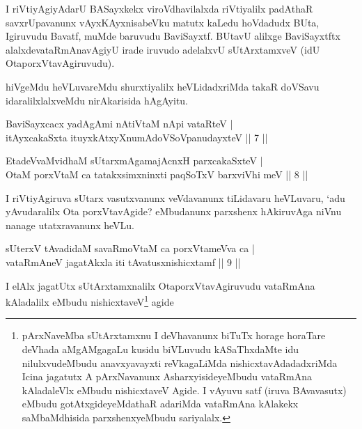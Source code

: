 \begin{artha}
I riVtiyAgiyAdarU BASayxkekx viroVdhavilalxda riVtiyalilx padAthaR savxrUpavanunx vAyxKAyxnisabeVku matutx kaLedu hoVdadudx BUta, Igiruvudu Bavatf, muMde baruvudu BaviSayxtf. BUtavU alilxge BaviSayxtftx alalxde\break vataRmAnavAgiyU irade iruvudo adelalxvU sUtArxtamxveV (idU OtaporxVtavAgiruvudu).

hiVgeMdu heVLuvareMdu shurxtiyalilx heVLidadxriMda takaR doVSavu idaralilxlalxveMdu nirAkarisida hAgAyitu.
\end{artha}%

\begin{shl}
BaviSayxcacx yadAgAmi nAtiVtaM nApi vataRteV |\\
itAyxcakaSxta ituyxkAtxyX\s numAdoVSoV\s panudayxteV \hfill || 7 ||
\end{shl}

\begin{shl}
EtadeVvaMvidhaM sUtarxmAgamajAcnxH parxcakaSxteV |\\
OtaM porxVtaM ca tatakxsimxninxti paqSoTxV barxviVhi meV \hfill || 8 ||
\end{shl}

\begin{artha}
I riVtiyAgiruva sUtarx vasutxvanunx veVdavanunx tiLidavaru heVLuvaru, `adu yAvudaralilx Ota porxVtavAgide? eMbudanunx parxshenx hAkiruvAga niVnu nanage utatxravanunx heVLu.
\end{artha}


\begin{shl}
sUterxV tAvadidaM savaRmoVtaM ca porxVtameVva ca |\\
vataRmAneV jagatAkxla iti tAvatusxnishicxtamf \hfill || 9 ||
\end{shl}

\begin{artha}
I elAlx jagatUtx sUtArxtamxnalilx OtaporxVtavAgiruvudu vataRmAna kAladalilx eMbudu nishicxtaveV\footnote{pArxNaveMba sUtArxtamxnu I deVhavanunx biTuTx horage horaTare deVhada aMgAMgagaLu kusidu biVLuvudu kASaThxdaMte idu nilulxvudeMbudu anavxyavayxti reVkagaLiMda nishicxtavAdadadxriMda Icina jagatutx A pArxNavanunx AsharxyisideyeMbudu vataRmAna kAladaleVlx eMbudu nishicxtaveV Agide. I vAyuvu satf (iruva BAvavasutx) eMbudu gotAtxgideyeMdathaR adariMda vataRmAna kAlakekx saMbaMdhisida parxshenxyeMbudu sariyalalx.} agide
\end{artha}

